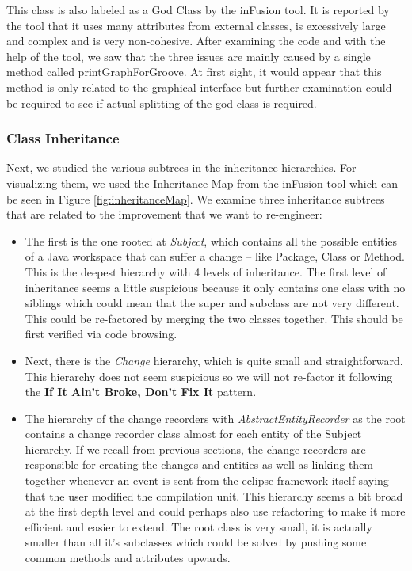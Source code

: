\documentclass[a4paper]{article}
\begin{document}
This class is also labeled as a God Class by the inFusion tool. It is reported by the tool that it uses many attributes from external classes, is excessively large and complex and is very non-cohesive. After examining the code and with the help of the tool, we saw that the three issues are mainly caused by a single method called printGraphForGroove. At first sight, it would appear that this method is only related to the graphical interface but further examination could be required to see if actual splitting of the god class is required.

\subsubsection{Class Inheritance}
\label{sec:classInheritance}
Next, we studied the various subtrees in the inheritance hierarchies. For visualizing them, we used the Inheritance Map from the inFusion tool which can be seen in Figure \ref{fig:inheritanceMap}. We examine three inheritance subtrees that are related to the improvement that we want to re-engineer: 

\begin{itemize}
\item The first is the one rooted at \emph{Subject}, which contains all the possible entities of a Java workspace that can suffer a change -- like Package, Class or Method. This is the deepest hierarchy with 4 levels of inheritance. The first level of inheritance seems a little suspicious because it only contains one class with no siblings which could mean that the super and subclass are not very different. This could be re-factored by merging the two classes together. This should be first verified via code browsing.

\item Next, there is the \emph{Change} hierarchy, which is quite small and straightforward. This hierarchy does not seem suspicious so we will not re-factor it following the \textbf{If It Ain’t Broke, Don’t Fix It} pattern.

\item The hierarchy of the change recorders with \emph{AbstractEntityRecorder} as the root contains a change recorder class almost for each entity of the Subject hierarchy. If we recall from previous sections, the change recorders are responsible for creating the changes and entities as well as linking them together whenever an event is sent from the eclipse framework itself saying that the user modified the compilation unit. This hierarchy seems a bit broad at the first depth level and could perhaps also use refactoring to make it more efficient and easier to extend. The root class is very small, it is actually smaller than all it's subclasses which could be solved by pushing some common methods and attributes upwards.
\end{itemize}
\end{document}
